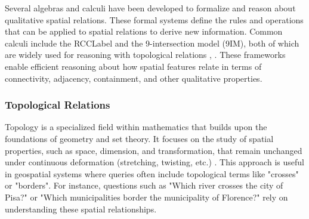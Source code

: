 Several algebras and calculi have been developed to formalize and reason about qualitative spatial relations. These formal systems define the rules and operations that can be applied to spatial relations to derive new information. Common calculi include the \acrfull{RCCLabel} and the 9-intersection model (9IM), both of which are widely used for reasoning with topological relations \cite{randellSpatialLogicBased1992}, \cite{egenhoferCategorizingBinaryTopological1991}. These frameworks enable efficient reasoning about how spatial features relate in terms of connectivity, adjacency, containment, and other qualitative properties.



\subsubsection{Topological Relations}\label{II-subsec:topologicalRelations}

Topology is a specialized field within mathematics that builds upon the foundations of geometry and set theory. It focuses on the study of spatial properties, such as space, dimension, and transformation, that remain unchanged under continuous deformation (stretching, twisting, etc.) \cite{janichTopology1984}. This approach is useful in geospatial systems where queries often include topological terms like "crosses" or "borders". For instance, questions such as "Which river crosses the city of Pisa?" or "Which municipalities border the municipality of Florence?" rely on understanding these spatial relationships.

